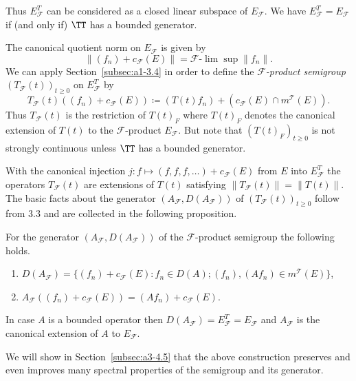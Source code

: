Thus $E_{\mathcal{F}}^{T}$ can be considered as a closed linear subspace of\/ $E_{\mathcal{F}}$. 
We have $E_{\mathcal{F}}^{T} = E_{\mathcal{F}}$ if (and only if) $\TT$ has a bounded generator.

The canonical quotient norm on $E_{\mathcal{F}}$ is given by
\[
    \|(f_{n}) + c_{\mathcal{F}}(E)\| = \mathcal{F}\text{-}\lim \sup \|f_{n}\| .
\]
We can apply Section~\ref{subsec:a1-3.4} in order to define the \emph{$\mathcal{F}$-product semigroup} $(T_{\mathcal{F}}(t))_{t \geq 0}$ on $E_{\mathcal{F}}^{T}$ by
\[
    T_{\mathcal{F}}(t)((f_{n}) + c_{\mathcal{F}}(E)) \coloneqq (T(t)f_{n}) 
    	+ ( c_{\mathcal{F}}(E)\cap m^{\mathcal{T}}(E) ) .
\]
Thus $T_{\mathcal{F}}(t)$ is the restriction of\/ $T(t)_{F}$ where $T(t)_{F}$ denotes the canonical extension of\/ $T(t)$ to the $\mathcal{F}$-product $E_{\mathcal{F}}$. 
But note that $(T(t)_{F})_{t \geq 0}$ is not strongly continuous unless $\TT$ has a bounded generator.

With the canonical injection $j \colon f \mapsto (f,f,f,\ldots) + c_{\mathcal{F}}(E)$ from $E$ into $E_{\mathcal{F}}^{T}$ the operators $T_{\mathcal{F}}(t)$ are extensions of\/ $T(t)$ satisfying $\|T_{\mathcal{F}}(t)\| = \|T(t)\|$. The basic facts about the generator $(A_{\mathcal{F}},D(A_{\mathcal{F}}))$ of\/ $(T_{\mathcal{F}}(t))_{t \geq 0}$ follow from 3.3 and are collected in the following proposition.
\begin{proposition*}\label{prop:a1-3.6}
For the generator $(A_{\mathcal{F}},D(A_{\mathcal{F}}))$ of the $\mathcal{F}$-product semigroup the following holds.
\begin{enumerate}[\upshape(i)]
\item 
$D(A_{\mathcal{F}}) = \{(f_{n}) + c_{\mathcal{F}}(E) \colon f_{n} \in D(A); (f_{n}), (Af_{n}) \in m^{\mathcal{T}}(E)\}$,

\item 
$A_{\mathcal{F}}((f_{n}) + c_{\mathcal{F}}(E)) = (Af_{n}) + c_{\mathcal{F}}(E)$.

\end{enumerate}
\end{proposition*}
In case $A$ is a bounded operator then $D(A_{\mathcal{F}}) = E_{\mathcal{F}}^{T} = E_{\mathcal{F}}$ and $A_{\mathcal{F}}$ is the canonical extension of\/ $A$ to $E_{\mathcal{F}}$.

We will show in Section~\ref{subsec:a3-4.5} that the above construction preserves and even improves many spectral properties of the semigroup and its generator.
